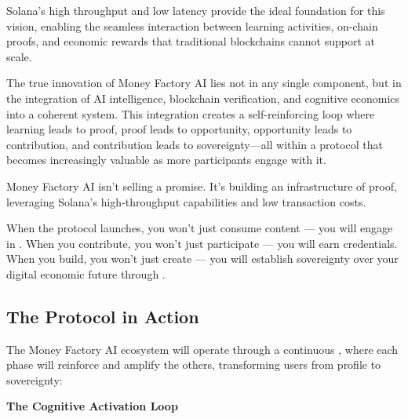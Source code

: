 Solana's high throughput and low latency provide the ideal foundation for this vision, enabling the seamless interaction between learning activities, on-chain proofs, and economic rewards that traditional blockchains cannot support at scale.

\begin{mfai-note}
The true innovation of Money Factory AI lies not in any single component, but in the integration of AI intelligence, blockchain verification, and cognitive economics into a coherent system. This integration creates a self-reinforcing loop where learning leads to proof, proof leads to opportunity, opportunity leads to contribution, and contribution leads to sovereignty—all within a protocol that becomes increasingly valuable as more participants engage with it.
\end{mfai-note}

\newpage

Money Factory AI isn't selling a promise. It's building an infrastructure of proof, leveraging Solana's high-throughput capabilities and low transaction costs.

When the protocol launches, you won't just consume content — you will engage in . When you contribute, you won't just participate — you will earn  credentials. When you build, you won't just create — you will establish sovereignty over your digital economic future through .

\subsection*{The Protocol in Action}

The Money Factory AI ecosystem will operate through a continuous , where each phase will reinforce and amplify the others, transforming users from profile to sovereignty:

\vspace{1em}
\textcolor{solana-green!70!black}{\textbf{The Cognitive Activation Loop\texttrademark}}

